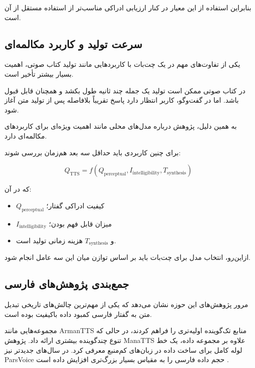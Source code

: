 بنابراین استفاده از این معیار در کنار ارزیابی ادراکی
مناسب‌تر از استفاده مستقل از آن است.


\subsection{سرعت تولید و کاربرد مکالمه‌ای}

یکی از تفاوت‌های مهم  در یک چت‌بات با کاربردهایی مانند
تولید کتاب صوتی، اهمیت بسیار بیشتر تأخیر است.

در کتاب صوتی ممکن است تولید یک جمله چند ثانیه طول بکشد و
همچنان قابل قبول باشد.
اما در گفت‌وگو، کاربر انتظار دارد پاسخ تقریباً بلافاصله
پس از تولید متن آغاز شود.

به همین دلیل، پژوهش درباره مدل‌های محلی مانند  اهمیت
ویژه‌ای برای کاربردهای مکالمه‌ای دارد.

برای چنین کاربردی باید حداقل سه بعد هم‌زمان بررسی شوند:

\begin{equation}
Q_{\mathrm{TTS}}
=
f(
Q_{\mathrm{perceptual}},
I_{\mathrm{intelligibility}},
T_{\mathrm{synthesis}}
)
\end{equation}

که در آن:

\begin{itemize}

    \item $Q_{\mathrm{perceptual}}$ کیفیت ادراکی گفتار؛
    \item $I_{\mathrm{intelligibility}}$ میزان قابل فهم بودن؛
    \item و $T_{\mathrm{synthesis}}$ هزینه زمانی تولید است.

\end{itemize}

ازاین‌رو، انتخاب مدل  برای چت‌بات باید بر اساس توازن
میان این سه عامل انجام شود.


\subsection{جمع‌بندی پژوهش‌های  فارسی}

مرور پژوهش‌های این حوزه نشان می‌دهد که یکی از مهم‌ترین
چالش‌های تاریخی تبدیل متن به گفتار فارسی کمبود داده باکیفیت
بوده است.

مجموعه‌هایی مانند ArmanTTS منابع تک‌گوینده اولیه‌تری را
فراهم کردند، در حالی که  تنوع چندگوینده
بیشتری ارائه داد.
پژوهش ManaTTS علاوه بر مجموعه داده، یک خط لوله کامل برای
ساخت داده  در زبان‌های کم‌منبع معرفی کرد.
در سال‌های جدیدتر نیز ParsVoice حجم داده فارسی را به مقیاس
بسیار بزرگ‌تری افزایش داده است
\cite{shamgholi2023armantts,
      adibian2023deepminemultitts,
      qharabagh2025manatts,
      ranjbar2025parsvoice}.

